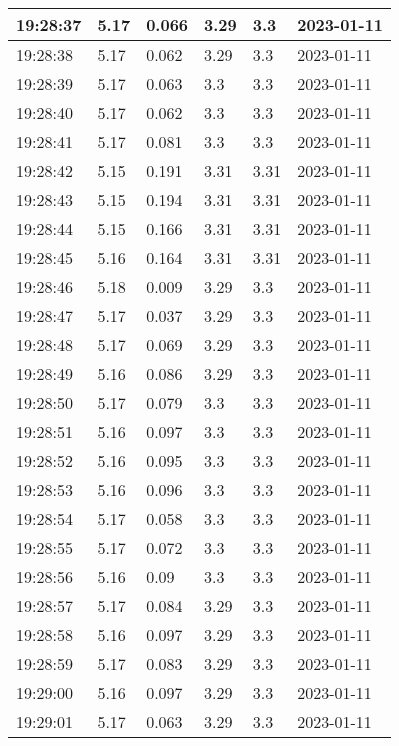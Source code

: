 \begin{longtable}{|l|l|l|l|l|l|}
        19:28:37 & 5.17 & 0.066 & 3.29 & 3.3 & 2023-01-11 \\ \hline
        19:28:38 & 5.17 & 0.062 & 3.29 & 3.3 & 2023-01-11 \\ \hline
        19:28:39 & 5.17 & 0.063 & 3.3 & 3.3 & 2023-01-11 \\ \hline
        19:28:40 & 5.17 & 0.062 & 3.3 & 3.3 & 2023-01-11 \\ \hline
        19:28:41 & 5.17 & 0.081 & 3.3 & 3.3 & 2023-01-11 \\ \hline
        19:28:42 & 5.15 & 0.191 & 3.31 & 3.31 & 2023-01-11 \\ \hline
        19:28:43 & 5.15 & 0.194 & 3.31 & 3.31 & 2023-01-11 \\ \hline
        19:28:44 & 5.15 & 0.166 & 3.31 & 3.31 & 2023-01-11 \\ \hline
        19:28:45 & 5.16 & 0.164 & 3.31 & 3.31 & 2023-01-11 \\ \hline
        19:28:46 & 5.18 & 0.009 & 3.29 & 3.3 & 2023-01-11 \\ \hline
        19:28:47 & 5.17 & 0.037 & 3.29 & 3.3 & 2023-01-11 \\ \hline
        19:28:48 & 5.17 & 0.069 & 3.29 & 3.3 & 2023-01-11 \\ \hline
        19:28:49 & 5.16 & 0.086 & 3.29 & 3.3 & 2023-01-11 \\ \hline
        19:28:50 & 5.17 & 0.079 & 3.3 & 3.3 & 2023-01-11 \\ \hline
        19:28:51 & 5.16 & 0.097 & 3.3 & 3.3 & 2023-01-11 \\ \hline
        19:28:52 & 5.16 & 0.095 & 3.3 & 3.3 & 2023-01-11 \\ \hline
        19:28:53 & 5.16 & 0.096 & 3.3 & 3.3 & 2023-01-11 \\ \hline
        19:28:54 & 5.17 & 0.058 & 3.3 & 3.3 & 2023-01-11 \\ \hline
        19:28:55 & 5.17 & 0.072 & 3.3 & 3.3 & 2023-01-11 \\ \hline
        19:28:56 & 5.16 & 0.09 & 3.3 & 3.3 & 2023-01-11 \\ \hline
        19:28:57 & 5.17 & 0.084 & 3.29 & 3.3 & 2023-01-11 \\ \hline
        19:28:58 & 5.16 & 0.097 & 3.29 & 3.3 & 2023-01-11 \\ \hline
        19:28:59 & 5.17 & 0.083 & 3.29 & 3.3 & 2023-01-11 \\ \hline
        19:29:00 & 5.16 & 0.097 & 3.29 & 3.3 & 2023-01-11 \\ \hline
        19:29:01 & 5.17 & 0.063 & 3.29 & 3.3 & 2023-01-11 \\ \hline

\end{longtable}
